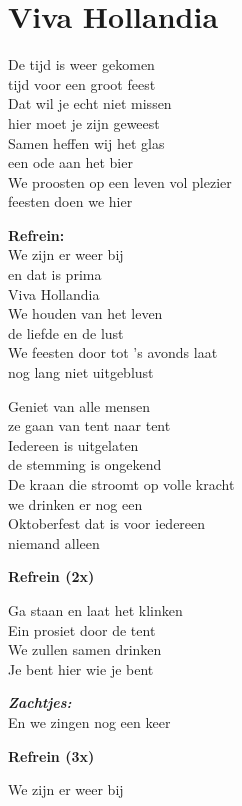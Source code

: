 \section{Viva Hollandia}
De tijd is weer gekomen\\
tijd voor een groot feest\\
Dat wil je echt niet missen\\
hier moet je zijn geweest\\
Samen heffen wij het glas\\
een ode aan het bier\\
We proosten op een leven vol plezier\\
feesten doen we hier

\textbf{Refrein:}\\
We zijn er weer bij\\
en dat is prima\\
Viva Hollandia\\
We houden van het leven\\
de liefde en de lust\\
We feesten door tot 's avonds laat\\
nog lang niet uitgeblust

Geniet van alle mensen\\
ze gaan van tent naar tent\\
Iedereen is uitgelaten\\
de stemming is ongekend\\
De kraan die stroomt op volle kracht\\
we drinken er nog een\\
Oktoberfest dat is voor iedereen\\
niemand alleen

\textbf{Refrein (2x)}

Ga staan en laat het klinken\\
Ein prosiet door de tent\\
We zullen samen drinken\\
Je bent hier wie je bent

\textit{\textbf{Zachtjes:}}\\
En we zingen nog een keer

\textbf{Refrein (3x)}

We zijn er weer bij